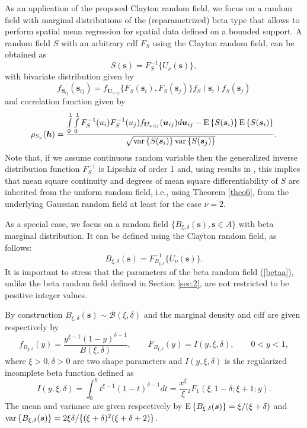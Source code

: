 \documentclass[times,sort&compress,3p]{elsarticle}
\theoremstyle{plain}%
\theoremstyle{definition}
\def\ss{\bm{s}}
\def\SS{\bm{S}}
\def\uu{\bm{u}}
\def\UU{\bm{U}}
\def\EE{{\rm E}}
\def\VV{{\rm var}}
\def\hh{\bm{h}}
\begin{document}
As an application of the proposed Clayton random field, we focus on a random field with marginal distributions of the (reparametrized) beta type that allows to perform spatial mean  regression for spatial  data defined on a bounded support.
A  random field $S$ with an  arbitrary cdf $F_S$ using the Clayton  random field, can be obtained as
\begin{equation*}\label{copula2}
S(\ss)=F_S^{-1}\{U_{\nu}(\ss)\},
\end{equation*}
with  bivariate distribution given by
\begin{equation}\label{bb44}
f_{\SS_{ij}}(\ss_{ij})=
f_{\UU_{\nu;ij}}\{F_S(\ss_i),F_S(\ss_j)\}f_S(\ss_i)f_S(\ss_j)
\end{equation}
and  correlation function given by
\begin{equation}\label{corruII}
\rho_{S_{\nu}}(\hh)=\frac{\int\limits_{0}^1\int\limits_{0}^1 F_{S}^{-1}(u_i)F_{S}^{-1}(u_j)f_{\bm{U}_{\nu;ij}}(\uu_{ij})d\uu_{ij}   -\EE\left\{S(\ss_i)\right\}\EE\left\{S(\ss_i)\right\}}{\sqrt{\VV\left\{S(\ss_i)\right\}\VV\left\{S(\ss_j)\right\}}}.
\end{equation}
Note that, if we assume continuous random variable then
the generalized inverse distribution function $F_{S}^{-1}$ is Lipschiz of order 1 \citep{qq2008} and, using results in \cite{BANERJEE200385}, this implies that mean square continuity and degrees of mean square differentiability of $S$ are inherited from the uniform random field, i.e., using Theorem \ref{theo6}, from the underlying Gaussian random field at least for the case $\nu=2$.


As a special case, we focus on  a random field $\{B_{\xi,\delta}(\ss), \ss \in A\}$ with beta marginal distribution. It can be   defined using the Clayton random field, as follows:
\begin{equation}\label{betaa}
B_{\xi,\delta}(\ss)=F^{-1}_{B_{\xi,\delta}}\{U_{\nu}(\ss)\}.
\end{equation}
It is important to stress that the parameters  of the beta random field (\ref{betaa}), unlike the beta random field defined in Section \ref{sec:2}, are  not restricted to be positive integer values.


By construction $B_{\xi,\delta}(\ss)\sim \mathcal{B}(\xi,\delta)$  and the marginal density and cdf are given respectively by
\begin{equation*}\label{ppl4}
f_{B_{\xi,\delta}}(y)=\frac{y^{\xi-1} (1-y)^{\delta-1}}{B(\xi,\delta)},\qquad F_{B_{\xi,\delta}}(y)=I(y,\xi,\delta), \qquad0<y<1,
\end{equation*}
where $\xi>0, \delta>0$ are two shape parameters and  $I(y,\xi,\delta)$ is the regularized incomplete beta function defined as
\begin{equation*}
I(y,\xi,\delta)=\int_{0}^{y}t^{\xi-1}(1-t)^{\delta-1}dt=\frac{x^{\xi}}{\xi}{}_2F_1(\xi,1-\delta;\xi+1;y).
\end{equation*}
The mean and variance are given respectively by $\EE\left\{B_{\xi,\delta}(\ss)\right\}=\xi/(\xi+\delta)$ and $\VV\left\{B_{\xi,\delta}(\ss)\right\}=2\xi \delta/\{(\xi+\delta)^2(\xi+\delta+2)\}$.
\end{document}
